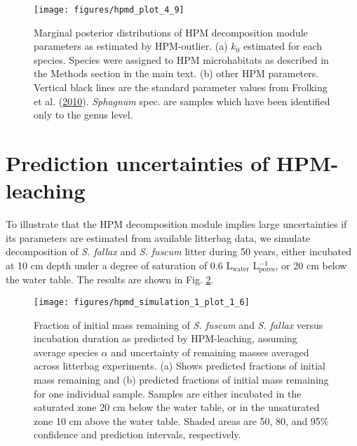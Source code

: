 \documentclass[
  12pt,
]{article}
\begin{document}
\begin{figure}[H]

{\centering \texttt{[image: figures/hpmd\_plot\_4\_9]} 

}

\caption{Marginal posterior distributions of HPM decomposition module parameters as estimated by HPM-outlier. (a) \(k_0\) estimated for each species. Species were assigned to HPM microhabitats as described in the Methods section in the main text. (b) other HPM parameters. Vertical black lines are the standard parameter values from Frolking et al. (\protect\hyperlink{ref-Frolking.2010}{2010}). \emph{Sphagnum} spec. are samples which have been identified only to the genus level.}\label{fig:sup-hpmd-plot-4-9}
\end{figure}

\hypertarget{sup-11}{%
\section{Prediction uncertainties of HPM-leaching}\label{sup-11}}

To illustrate that the HPM decomposition module implies large uncertainties if its parameters are estimated from available litterbag data, we simulate decomposition of \emph{S. fallax} and \emph{S. fuscum} litter during 50 years, either incubated at 10 cm depth under a degree of saturation of 0.6 L\(_\text{water}\) L\(_\text{pores}^{-1}\), or 20 cm below the water table. The results are shown in Fig. \ref{fig:sup-hpmd-simulation-1-plot-6}.



\begin{figure}[H]

{\centering \texttt{[image: figures/hpmd\_simulation\_1\_plot\_1\_6]} 

}

\caption{Fraction of initial mass remaining of \emph{S. fuscum} and \emph{S. fallax} versus incubation duration as predicted by HPM-leaching, assuming average species \(\alpha\) and uncertainty of remaining masses averaged across litterbag experiments. (a) Shows predicted fractions of initial mass remaining and (b) predicted fractions of initial mass remaining for one individual sample. Samples are either incubated in the saturated zone 20 cm below the water table, or in the unsaturated zone 10 cm above the water table. Shaded areas are 50, 80, and 95\% confidence and prediction intervals, respectively.}\label{fig:sup-hpmd-simulation-1-plot-6}
\end{figure}
\end{document}
